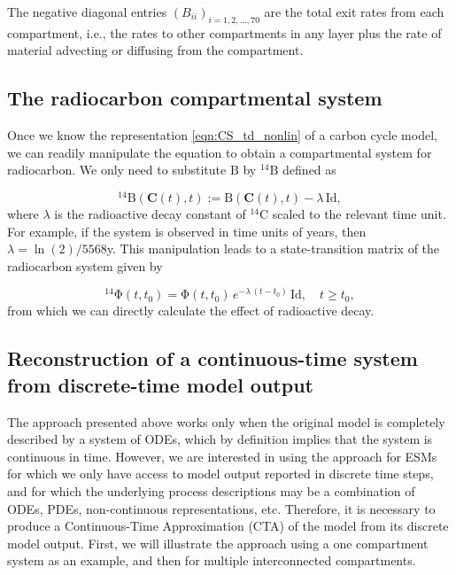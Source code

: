 \documentclass[draft]{agujournal2019}
\renewcommand{\vec}[1]{\mathbf{#1}}
\newcommand{\tens}[1]{\mathrm{#1}}
\newcommand{\id}{\tens{Id}}
\begin{document}
    The negative diagonal entries $(B_{ii})_{i=1,2,\ldots,70}$ are the total exit rates from each compartment, i.e., the rates to other compartments  in any layer plus the rate of material advecting or diffusing from the compartment.


\subsection{The radiocarbon compartmental system}
    Once we know the representation \eqref{eqn:CS_td_nonlin} of a carbon cycle model, we can readily manipulate the equation to obtain a compartmental system for radiocarbon.
    We only need to substitute $\tens{B}$ by ${}^{14}\tens{B}$ defined as

    \begin{equation*}
        {}^{14}\tens{B}(\vec{C}(t),t) := \tens{B}(\vec{C}(t),t) - \lambda\,\id,
    \end{equation*}
    where $\lambda$ is the radioactive decay constant of ${}^{14}$C scaled to the relevant time unit.
    For example, if the system is observed in time units of years, then $\lambda=\ln(2)/5568$y.
    This manipulation leads to a state-transition matrix of the radiocarbon system given by

    \begin{equation*}
        {}^{14}\tens{\Phi}(t,t_0) = \tens{\Phi}(t,t_0)\, e^{-\lambda\,(t-t_0)}\,\id, \quad t\geq t_0,
    \end{equation*}
    from which we can directly calculate the effect of radioactive decay.


\subsection{Reconstruction of a continuous-time system from discrete-time model output}
The approach presented above works only when the original model is completely described by a system of ODEs, which by definition implies that the system is continuous in time. However, we are interested in using the approach for ESMs for which we only have access to model output reported in discrete time steps, and for which the underlying process descriptions may be a combination of ODEs, PDEs, non-continuous representations, etc. Therefore, it is necessary to produce a Continuous-Time Approximation (CTA) of the model from its discrete model output. First, we will illustrate the approach using a one compartment system as an example, and then for multiple interconnected compartments. 
\end{document}
